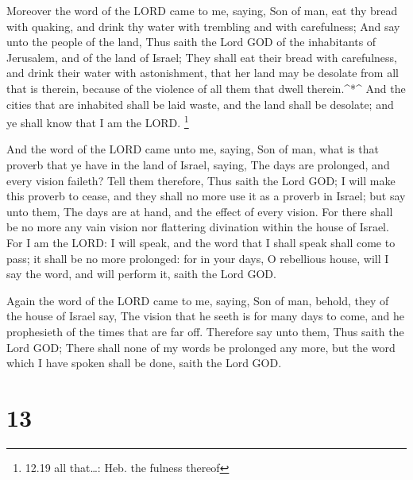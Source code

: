  Moreover the word of the LORD came to me, saying,
 Son of man, eat thy bread with quaking, and drink thy
water with trembling and with carefulness;  And say unto
the people of the land, Thus saith the Lord GOD of the inhabitants of
Jerusalem, and of the land of Israel; They shall eat their bread with
carefulness, and drink their water with astonishment, that her land may
be desolate from all that is therein, because of the violence of all
them that dwell therein.\^{}*\^{}  And the cities that are
inhabited shall be laid waste, and the land shall be desolate; and ye
shall know that I am the LORD. \footnote{12.19 all that\ldots: Heb. the
  fulness thereof}

 And the word of the LORD came unto me, saying,
 Son of man, what is that proverb that ye have in the land
of Israel, saying, The days are prolonged, and every vision faileth?
 Tell them therefore, Thus saith the Lord GOD; I will make
this proverb to cease, and they shall no more use it as a proverb in
Israel; but say unto them, The days are at hand, and the effect of every
vision.  For there shall be no more any vain vision nor
flattering divination within the house of Israel.  For I am
the LORD: I will speak, and the word that I shall speak shall come to
pass; it shall be no more prolonged: for in your days, O rebellious
house, will I say the word, and will perform it, saith the Lord GOD.

 Again the word of the LORD came to me, saying,
 Son of man, behold, they of the house of Israel say, The
vision that he seeth is for many days to come, and he prophesieth of the
times that are far off.  Therefore say unto them, Thus
saith the Lord GOD; There shall none of my words be prolonged any more,
but the word which I have spoken shall be done, saith the Lord GOD.

\hypertarget{section-12}{%
\section{13}\label{section-12}}

